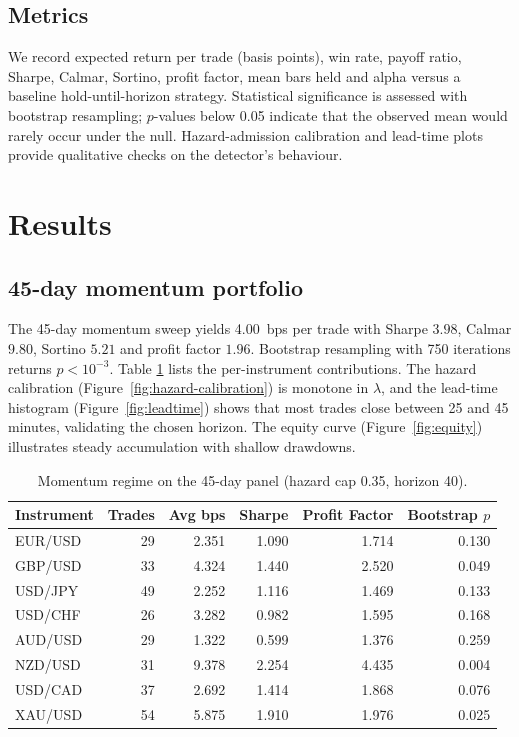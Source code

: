 \documentclass[11pt]{article}
\begin{document}
\subsection{Metrics}
We record expected return per trade (basis points), win rate, payoff
ratio, Sharpe, Calmar, Sortino, profit factor, mean bars held and
alpha versus a baseline hold-until-horizon strategy.  Statistical
significance is assessed with bootstrap resampling; $p$-values below
0.05 indicate that the observed mean would rarely occur under the null.
Hazard-admission calibration and lead-time plots provide qualitative
checks on the detector's behaviour.

\section{Results}

\subsection{45-day momentum portfolio}
The 45-day momentum sweep yields \SI{4.00}{bps} per trade with Sharpe
\(3.98\), Calmar \(9.80\), Sortino \(5.21\) and profit factor \(1.96\).
Bootstrap resampling with 750 iterations returns \(p<10^{-3}\).  Table
\ref{tab:momentum45} lists the per-instrument contributions.  The
hazard calibration (Figure~\ref{fig:hazard-calibration}) is monotone in
$\lambda$, and the lead-time histogram (Figure~\ref{fig:leadtime}) shows
that most trades close between 25 and 45 minutes, validating the
chosen horizon.  The equity curve (Figure~\ref{fig:equity}) illustrates
steady accumulation with shallow drawdowns.

\begin{table}[h]
  \centering
  \caption{Momentum regime on the 45-day panel (hazard cap 0.35, horizon 40).}
  \label{tab:momentum45}
  \begin{tabular}{lrrrrr}
    \toprule
    Instrument & Trades & Avg bps & Sharpe & Profit Factor & Bootstrap $p$ \\
    \midrule
    EUR/USD & 29 & 2.351 & 1.090 & 1.714 & 0.130 \\
    GBP/USD & 33 & 4.324 & 1.440 & 2.520 & 0.049 \\
    USD/JPY & 49 & 2.252 & 1.116 & 1.469 & 0.133 \\
    USD/CHF & 26 & 3.282 & 0.982 & 1.595 & 0.168 \\
    AUD/USD & 29 & 1.322 & 0.599 & 1.376 & 0.259 \\
    NZD/USD & 31 & 9.378 & 2.254 & 4.435 & 0.004 \\
    USD/CAD & 37 & 2.692 & 1.414 & 1.868 & 0.076 \\
    XAU/USD & 54 & 5.875 & 1.910 & 1.976 & 0.025 \\
    \bottomrule
  \end{tabular}
\end{table}
\end{document}
